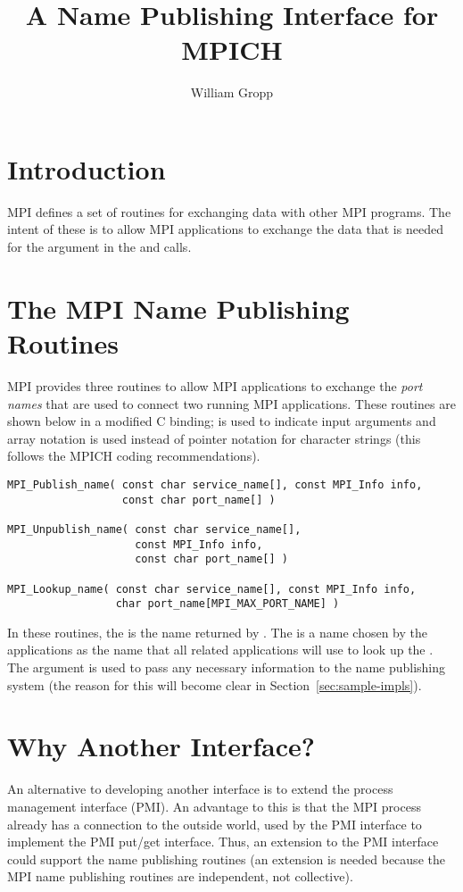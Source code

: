\documentclass{article}
\begin{document}
\title{A Name Publishing Interface for MPICH}
\author{William Gropp}
\maketitle

\section{Introduction}

MPI defines a set of routines for exchanging data with other MPI
programs.  The intent of these is to allow MPI applications to 
exchange the data that is needed for the  argument in the
 and  calls.  

\section{The MPI Name Publishing Routines}
MPI provides three routines to allow MPI applications to exchange the
\emph{port names} that are used to connect two running MPI
applications.  These routines are shown below in a modified C binding;
 is used to indicate input arguments and array notation is
used instead of pointer notation for character strings (this follows
the MPICH coding recommendations).
\begin{verbatim}
MPI_Publish_name( const char service_name[], const MPI_Info info, 
                  const char port_name[] )

MPI_Unpublish_name( const char service_name[], 
                    const MPI_Info info, 
                    const char port_name[] )

MPI_Lookup_name( const char service_name[], const MPI_Info info, 
                 char port_name[MPI_MAX_PORT_NAME] )
\end{verbatim}
In these routines, the  is the name returned by
.  
The  is a name chosen by the
applications as the name that all related applications will use to
look up the .
The  argument is used to pass any necessary information to
the name publishing system (the reason for this will become clear in
Section~\ref{sec:sample-impls}). 

\section{Why Another Interface?}
An alternative to developing another interface is to extend the
process management interface (PMI).  An advantage to this is that the
MPI process already has a connection to the outside world, used by the
PMI interface to implement the PMI put/get interface.  Thus, an
extension to the PMI interface could support the name publishing
routines (an extension is needed because the MPI name publishing
routines are independent, not collective).
\end{document}

